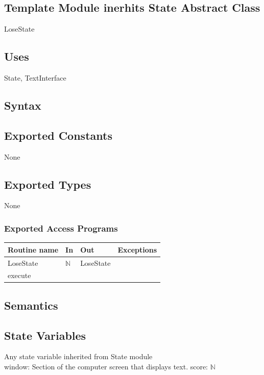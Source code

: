 \documentclass[12pt]{article}
\begin{document}
\subsection* {Template Module inerhits State Abstract Class}

LoseState

\subsection*{Uses}

State, TextInterface

\subsection* {Syntax}

\subsection*{Exported Constants}

None

\subsection*{Exported Types}

None

\subsubsection* {Exported Access Programs}

\begin{tabular}{| l | l | l | p{6cm} |}
\hline
\textbf{Routine name} & \textbf{In} & \textbf{Out} & \textbf{Exceptions}\\
\hline
LoseState & $\mathbb{N}$ & LoseState & ~ \\
\hline
execute & ~ & ~ & ~ \\
\hline
\end{tabular}

\subsection* {Semantics}

\subsection*{State Variables}

Any state variable inherited from State module\\
window: Section of the computer screen that displays text.
score: $\mathbb{N}$
\end{document}
